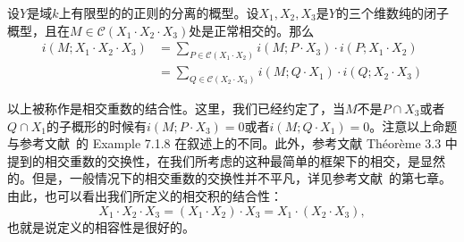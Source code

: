 \begin{proposition} \label{associativity of intersection}
设$Y$是域$k$上有限型的的正则的分离的概型。设$X_1,X_2,X_3$是$Y$的三个维数纯的闭子概型，且在$M\in \mathcal{C}(X_1\cdot X_2\cdot X_3)$处是正常相交的。那么
\begin{align}
i(M; X_1\cdot X_2\cdot X_3) & = \sum\limits_{P\in \mathcal{C}(X_1\cdot X_2)} i(M; P\cdot X_3)\cdot i(P; X_1\cdot X_2) \\
& = \sum\limits_{Q\in \mathcal{C}(X_2\cdot X_3)} i(M; Q\cdot X_1)\cdot i(Q; X_2\cdot X_3)
\end{align}
\end{proposition}
以上被称作是相交重数的结合性。这里，我们已经约定了，当$M$不是$P\cap X_3$或者$Q\cap X_1$的子概形的时候有$i(M; P\cdot X_3) = 0$或者$i(M; Q\cdot X_1) = 0$。注意以上命题与参考文献~的 Example 7.1.8 在叙述上的不同。此外，参考文献 Th\'{e}or\`{e}me 3.3 中提到的相交重数的交换性，在我们所考虑的这种最简单的框架下的相交，是显然的。但是，一般情况下的相交重数的交换性并不平凡，详见参考文献~的第七章。由此，也可以看出我们所定义的相交积的结合性：
\begin{equation}
X_1\cdot X_2\cdot X_3 = (X_1\cdot X_2)\cdot X_3 = X_1\cdot (X_2\cdot X_3),
\end{equation}
也就是说定义的相容性是很好的。





